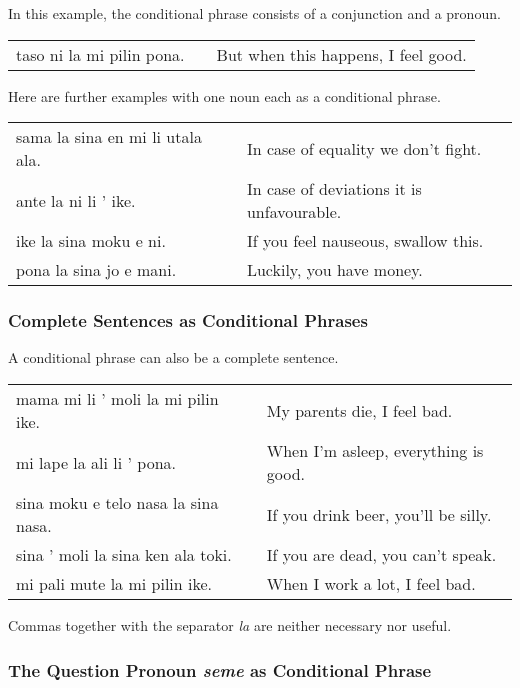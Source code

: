 In this example, the conditional phrase consists of a conjunction and a pronoun. 

\begin{supertabular}{p{5,5cm}|ll}
taso ni la mi pilin pona. && But when this happens, I feel good. \\
\end{supertabular} 

Here are further examples with one noun each as a conditional phrase.

\begin{supertabular}{p{5,5cm}|ll}
sama la sina en mi li utala ala. && In case of equality we don't fight. \\
ante la ni li ' ike. && In case of deviations it is unfavourable.  \\
ike la sina moku e ni. && If you feel nauseous, swallow this. \\
pona la sina jo e mani. && Luckily, you have money. \\
\end{supertabular} 

%
%
\subsubsection*{Complete Sentences as Conditional Phrases}
%
%
A conditional phrase can also be a complete sentence.

\begin{supertabular}{p{5,5cm}|ll}
mama mi li ' moli la mi pilin ike. && My parents die, I feel bad. \\
mi lape la ali li ' pona. && When I'm asleep, everything is good. \\
sina moku e telo nasa la sina nasa. && If you drink beer, you'll be silly. \\
sina ' moli la sina ken ala toki. && If you are dead, you can't speak. \\
mi pali mute la mi pilin ike. && When I work a lot, I feel bad. \\
\end{supertabular} 

Commas together with the separator \textit{la} are neither necessary nor useful. 

%
%
\subsubsection*{The Question Pronoun \textit{seme} as Conditional Phrase}
%
%

